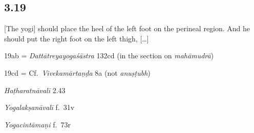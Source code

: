 \begin{ekdosis}

\subsection*{3.19}
\begin{translation}[hp03_019]
{}[The yogi] should place the heel of the left foot on the perineal region. And he should put the right foot on the left thigh, [\dots]
\end{translation}

\begin{sources}[hp03_019]
19ab = \emph{Dattātreyayogaśāstra} 132cd (in the section on \emph{mahāmudrā})
\begin{versinnote}
\end{versinnote}

19cd = Cf.~\emph{Vivekamārtaṇḍa} 8a (not \emph{anuṣṭubh})
\begin{versinnote}
\end{versinnote}
\end{sources}

\begin{testimonia}[hp03_019]
\emph{Haṭharatnāvalī} 2.43
\begin{versinnote}
\end{versinnote}

\emph{Yogalakṣanāvalī} f.~31v
\begin{versinnote}
\end{versinnote}

\emph{Yogacintāmaṇi} f.~73r
\begin{versinnote}
\end{versinnote}


\end{testimonia}
\end{ekdosis}

